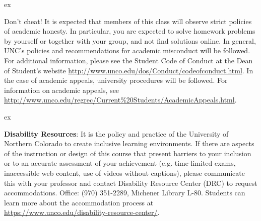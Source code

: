 \documentclass[11pt,letterpaper]{article}
\begin{document}
 ex

 Don't cheat!  It is expected that members of this class will observe strict policies of academic honesty.  In particular, you are expected to solve homework problems by yourself or together with your group, and not find solutions online.  In general, UNC's policies and recommendations for academic misconduct will be followed. For additional information, please see the Student Code of Conduct at the Dean of Student's website \url{http://www.unco.edu/dos/Conduct/codeofconduct.html}. In the case of academic appeals, university procedures will be followed. For information on academic appeals, see \url{http://www.unco.edu/regrec/Current%20Students/AcademicAppeals.html}.

 ex

\noindent\textbf{Disability Resources}: It is the policy and practice of the University of Northern Colorado to create inclusive learning environments.  If there are aspects of the instruction or design of this course that present barriers to your inclusion or to an accurate assessment of your achievement (e.g. time-limited exams, inaccessible web content, use of videos without captions), please communicate this with your professor and contact Disability Resource Center (DRC) to request accommodations.  Office: (970) 351-2289, Michener Library L-80. Students can learn more about the accommodation process at  \url{https://www.unco.edu/disability-resource-center/}.
\end{document}

